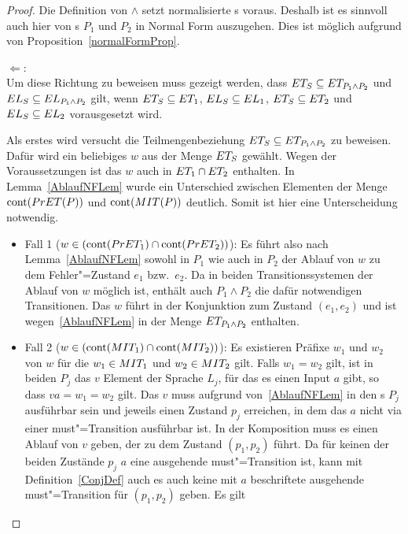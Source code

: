\begin{proof}
  Die Definition von $\land$ setzt normalisierte \MEIO{}s voraus. Deshalb ist
  es sinnvoll auch hier von \MEIO{}s $P_1$ und $P_2$ in Normal Form auszugehen.
  Dies ist möglich aufgrund von Proposition~\ref{normalFormProp}.

  \glqq $\Leftarrow$\grqq{}:\\
  Um diese Richtung zu beweisen muss gezeigt werden, dass $ET _S \subseteq ET
  _{P_1\land P_2}$ und $EL _S \subseteq EL _{P_1\land P_2}$ gilt, wenn $ET
  _S \subseteq ET _1$, $EL _S \subseteq EL _1$, $ET _S \subseteq ET _2$
  und $EL _S \subseteq EL _2$ vorausgesetzt wird.

  Als erstes wird versucht die Teilmengenbeziehung $ET _S \subseteq ET
  _{P_1\land P_2}$ zu beweisen. Dafür wird ein beliebiges $w$ aus der Menge
  $ET _S$ gewählt. Wegen der Voraussetzungen ist das $w$ auch in $ET _1\cap
  ET _2$ enthalten. In Lemma~\ref{AblaufNFLem} wurde ein Unterschied zwischen
  Elementen der Menge $\mathrm{cont} (PrET (P))$ und $\mathrm{cont} (MIT (P))$ deutlich.
  Somit ist hier eine Unterscheidung notwendig.
  \begin{itemize}
    \item Fall 1 ($w\in(\mathrm{cont} (PrET _1)\cap \mathrm{cont}(PrET _2))$): Es führt also
      nach Lemma~\ref{AblaufNFLem} sowohl in $P_1$ wie auch in $P_2$ der Ablauf
      von $w$ zu dem Fehler"=Zustand $e_1$ bzw.\ $e_2$. Da in beiden
      Transitionssystemen der Ablauf von $w$ möglich ist, enthält auch
      $P_1\land P_2$ die dafür notwendigen Transitionen. Das $w$ führt in der
      Konjunktion zum Zustand $(e_1,e_2)$ und ist wegen~\ref{AblaufNFLem} in
      der Menge $ET _{P_1\land P_2}$ enthalten.
    \item Fall 2 ($w\in(\mathrm{cont} (MIT _1)\cap \mathrm{cont} (MIT _2))$): Es existieren
      Präfixe $w_1$ und $w_2$ von $w$ für die $w_1\in MIT _1$ und $w_2\in MIT
      _2$ gilt. Falls $w_1=w_2$ gilt, ist in beiden $P_j$ das $v$ Element der
      Sprache $L_j$, für das es einen Input $a$ gibt, so dass $va=w_1=w_2$
      gilt. Das $v$ muss aufgrund von~\ref{AblaufNFLem} in den \MEIO{}s $P_j$
      ausführbar sein und jeweils einen Zustand $p_j$ erreichen, in dem das $a$
      nicht via einer must"=Transition ausführbar ist. In der Komposition muss
      es einen Ablauf von $v$ geben, der zu dem Zustand $(p_1,p_2)$ führt. Da
      für keinen der beiden Zustände $p_j$ $a$ eine ausgehende must"=Transition
      ist, kann mit Definition~\ref{ConjDef} auch es auch keine mit $a$
      beschriftete ausgehende must"=Transition für $(p_1,p_2)$ geben. Es gilt

\end{itemize}
\end{proof}
